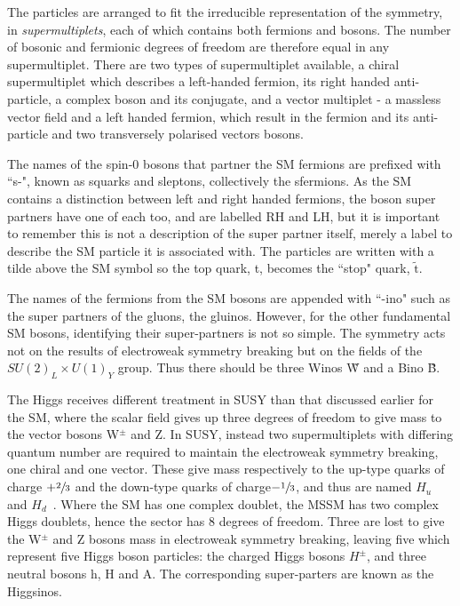 The particles are arranged to fit the irreducible representation of the symmetry, in \textit{supermultiplets}, each of which contains both fermions and bosons. The number of bosonic and fermionic degrees of freedom are therefore equal in any supermultiplet. There are two types of supermultiplet available, a chiral supermultiplet which describes a left-handed fermion, its right handed anti-particle, a complex boson and its conjugate, and a vector multiplet - a massless vector field and a left handed fermion, which result in the fermion and its anti-particle and two transversely polarised vectors bosons\cite{SUSYPrime}. 

The names of the spin-0 bosons that partner the SM fermions are prefixed with ``s-", known as squarks and sleptons, collectively the sfermions. As the SM contains a distinction between left and right handed fermions, the boson super partners have one of each too, and are labelled RH and LH, but it is important to remember this is not a description of the super partner itself, merely a label to describe the SM particle it is associated with. The particles are written with a tilde above the SM symbol so the top quark, t, becomes the ``stop" quark, $\tilde{\textrm{t}}$.

The names of the fermions from the SM bosons are appended with ``-ino" such as the super partners of the gluons, the gluinos. However, for the other fundamental SM bosons, identifying their super-partners is not so simple. The symmetry acts not on the results of electroweak symmetry breaking but on the fields of the $SU(2)_{L} \times U(1)_{Y}$ group. Thus there should be three Winos \~{W} and a Bino \~{B}. 

The Higgs receives different treatment in SUSY than that discussed earlier for the SM, where the scalar field gives up three degrees of freedom to give mass to the vector bosons W$^{\pm}$ and Z. In SUSY, instead two supermultiplets with differing quantum number are required to maintain the electroweak symmetry breaking, one chiral and one vector. These give mass respectively to the up-type quarks of charge $+\sfrac{2}{3}$ and the down-type quarks of charge$-\sfrac{1}{3}$, and thus are named $H_{u}$ and $H_{d}$~\cite{SUSYsuch}. Where the SM has one complex doublet, the MSSM has two complex Higgs doublets, hence the sector has 8 degrees of freedom. Three are lost to give the W$^{\pm}$ and Z bosons mass in electroweak symmetry breaking, leaving five which represent five Higgs boson particles: the charged Higgs bosons $H^{\pm}$, and three neutral bosons h, H and A. The corresponding super-parters are known as the Higgsinos.  


